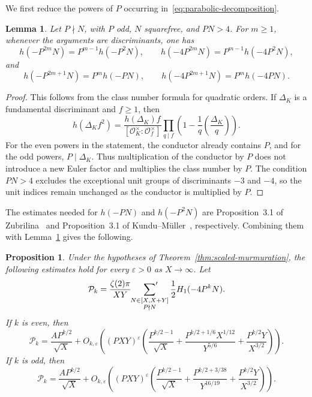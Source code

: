 \documentclass[12pt,reqno]{amsart}
\numberwithin{equation}{section}
\theoremstyle{plain}
\newtheorem{lemma}[theorem]{Lemma}
\newtheorem{proposition}[theorem]{Proposition}
\theoremstyle{definition}
\theoremstyle{remark}
\begin{document}
We first reduce the powers of $P$ occurring in~\eqref{eq:parabolic-decomposition}.

\begin{lemma}\label{lem:class-number-reduction}
Let $P\nmid N$, with $P$ odd, $N$ squarefree, and $PN>4$.  For $m\geq1$, whenever the arguments are discriminants, one has
\[
h(-P^{2m}N)=P^{m-1}h(-P^2N),
\qquad
h(-4P^{2m}N)=P^{m-1}h(-4P^2N),
\]
and
\[
h(-P^{2m+1}N)=P^mh(-PN),
\qquad
h(-4P^{2m+1}N)=P^mh(-4PN).
\]
\end{lemma}

\begin{proof}
This follows from the class number formula for quadratic orders.
If $\Delta_K$ is a fundamental discriminant and $f\geq1$, then
\[
h(\Delta_Kf^2)
=
\frac{h(\Delta_K)f}{[\mathcal O_K^\times:\mathcal O_f^\times]}
\prod_{q\mid f}
\left(1-\frac{1}{q}\left(\frac{\Delta_K}{q}\right)\right).
\]
For the even powers in the statement, the conductor already contains $P$, and for the odd powers, $P\mid\Delta_K$.
Thus multiplication of the conductor by $P$ does not introduce a new Euler factor and multiplies the class number by $P$.
The condition $PN>4$ excludes the exceptional unit groups of discriminants $-3$ and $-4$, so the unit indices remain unchanged as the conductor is multiplied by $P$.
\end{proof}

The estimates needed for $h(-PN)$ and $h(-P^2N)$ are
Proposition~3.1 of Zubrilina~\cite{Zubrilina2025} and
Proposition~3.1 of Kundu--M\"uller~\cite{KunduMuller2026}, respectively.
Combining them with Lemma~\ref{lem:class-number-reduction} gives the following.

\begin{proposition}\label{prop:parabolic-average}
Under the hypotheses of Theorem~\ref{thm:scaled-murmuration}, the following estimates hold for every $\varepsilon>0$ as $X\to\infty$.
Let
\[
\mathcal P_k
=
\frac{\zeta(2)\pi}{XY}
\sideset{}{'}\sum_{\substack{N\in[X,X+Y]\\P\nmid N}}
\frac12H_1(-4P^kN).
\]
If $k$ is even, then
\[
\mathcal P_k
=
\frac{AP^{k/2}}{\sqrt X}
+
O_{k,\varepsilon}\left(
(PXY)^\varepsilon
\left(
\frac{P^{k/2-1}}{\sqrt X}
+
\frac{P^{k/2+1/6}X^{1/12}}{Y^{5/6}}
+
\frac{P^{k/2}Y}{X^{3/2}}
\right)
\right).
\]
If $k$ is odd, then
\[
\mathcal P_k
=
\frac{AP^{k/2}}{\sqrt X}
+
O_{k,\varepsilon}\left(
(PXY)^\varepsilon
\left(
\frac{P^{k/2-1}}{\sqrt X}
+
\frac{P^{k/2+3/38}}{Y^{16/19}}
+
\frac{P^{k/2}Y}{X^{3/2}}
\right)
\right).
\]
\end{proposition}
\end{document}
